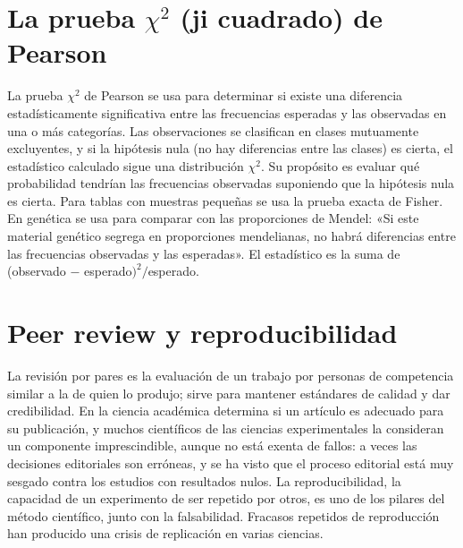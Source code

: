 \documentclass{book}
\begin{document}

\section{La prueba \(\chi^{2}\) (ji cuadrado) de Pearson}

La prueba \(\chi^{2}\) de Pearson se usa para determinar si existe una diferencia estadísticamente significativa entre las frecuencias esperadas y las observadas en una o más categorías. Las observaciones se clasifican en clases mutuamente excluyentes, y si la hipótesis nula (no hay diferencias entre las clases) es cierta, el estadístico calculado sigue una distribución \(\chi^{2}\). Su propósito es evaluar qué probabilidad tendrían las frecuencias observadas suponiendo que la hipótesis nula es cierta. Para tablas con muestras pequeñas se usa la prueba exacta de Fisher. En genética se usa para comparar con las proporciones de Mendel: «Si este material genético segrega en proporciones mendelianas, no habrá diferencias entre las frecuencias observadas y las esperadas». El estadístico es la suma de (observado \(-\) esperado\()^{2}/\)esperado.


\section{Peer review y reproducibilidad}

La revisión por pares es la evaluación de un trabajo por personas de competencia similar a la de quien lo produjo; sirve para mantener estándares de calidad y dar credibilidad. En la ciencia académica determina si un artículo es adecuado para su publicación, y muchos científicos de las ciencias experimentales la consideran un componente imprescindible, aunque no está exenta de fallos: a veces las decisiones editoriales son erróneas, y se ha visto que el proceso editorial está muy sesgado contra los estudios con resultados nulos. La reproducibilidad, la capacidad de un experimento de ser repetido por otros, es uno de los pilares del método científico, junto con la falsabilidad. Fracasos repetidos de reproducción han producido una crisis de replicación en varias ciencias.

\end{document}
